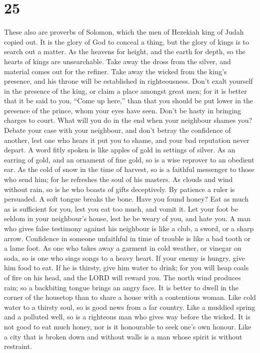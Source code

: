 \hypertarget{section-19}{%
\section{25}\label{section-19}}

 These also are proverbs of Solomon, which the men of
Hezekiah king of Judah copied out.  It is the glory of God
to conceal a thing, but the glory of kings is to search out a matter.
 As the heavens for height, and the earth for depth, so the
hearts of kings are unsearchable.  Take away the dross from
the silver, and material comes out for the refiner.  Take
away the wicked from the king's presence, and his throne will be
established in righteousness.  Don't exalt yourself in the
presence of the king, or claim a place amongst great men; 
for it is better that it be said to you, ``Come up here,'' than that you
should be put lower in the presence of the prince, whom your eyes have
seen.  Don't be hasty in bringing charges to court. What
will you do in the end when your neighbour shames you? 
Debate your case with your neighbour, and don't betray the confidence of
another,  lest one who hears it put you to shame, and your
bad reputation never depart.  A word fitly spoken is like
apples of gold in settings of silver.  As an earring of
gold, and an ornament of fine gold, so is a wise reprover to an obedient
ear.  As the cold of snow in the time of harvest, so is a
faithful messenger to those who send him; for he refreshes the soul of
his masters.  As clouds and wind without rain, so is he who
boasts of gifts deceptively.  By patience a ruler is
persuaded. A soft tongue breaks the bone.  Have you found
honey? Eat as much as is sufficient for you, lest you eat too much, and
vomit it.  Let your foot be seldom in your neighbour's
house, lest he be weary of you, and hate you.  A man who
gives false testimony against his neighbour is like a club, a sword, or
a sharp arrow.  Confidence in someone unfaithful in time of
trouble is like a bad tooth or a lame foot.  As one who
takes away a garment in cold weather, or vinegar on soda, so is one who
sings songs to a heavy heart.  If your enemy is hungry,
give him food to eat. If he is thirsty, give him water to drink;
 for you will heap coals of fire on his head, and the LORD
will reward you.  The north wind produces rain; so a
backbiting tongue brings an angry face.  It is better to
dwell in the corner of the housetop than to share a house with a
contentious woman.  Like cold water to a thirsty soul, so
is good news from a far country.  Like a muddied spring and
a polluted well, so is a righteous man who gives way before the wicked.
 It is not good to eat much honey, nor is it honourable to
seek one's own honour.  Like a city that is broken down and
without walls is a man whose spirit is without restraint.

